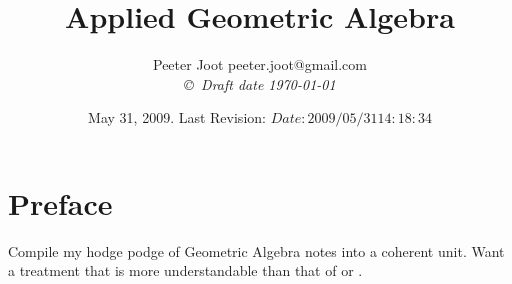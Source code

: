 \documentclass[12pt,leqno]{book}
\title{Applied Geometric Algebra}
\author{Peeter Joot  \quad peeter.joot@gmail.com \\
{\small\em \copyright \  Draft date \today }}
\date{ May 31, 2009.  Last Revision: $Date: 2009/05/31 14:18:34 $ }
\begin{document}
\maketitle
\tableofcontents
\listoffigures
\listoftables
\chapter*{Preface}\normalsize
\pagestyle{plain}

Compile my hodge podge of Geometric Algebra notes into a coherent unit.  Want a treatment that is more
understandable than that of 
\cite{doran2003gap} or 
\cite{hestenes1999nfc}.

%
%
%

\pagestyle{headings}



%

%





\end{document}
